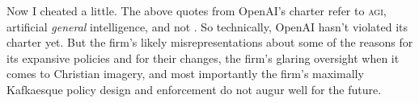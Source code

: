 Now I cheated a little. The above quotes from OpenAI's charter refer to
\textsc{agi}, artificial \emph{general} intelligence, and not \AI. So
technically, OpenAI hasn't violated its charter yet. But the firm's likely
misrepresentations about some of the reasons for its expansive policies and for
their changes, the firm's glaring oversight when it comes to Christian imagery,
and most importantly the firm's maximally Kafkaesque policy design and
enforcement do not augur well for the future.
